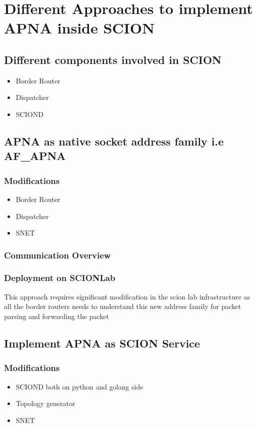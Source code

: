 
\chapter{Different Approaches to implement APNA inside SCION} %

\label{overview} %

\section{Different components involved in SCION}
\begin{itemize}
\item Border Router
\item Dispatcher
\item SCIOND
\end{itemize}

\section{APNA as native socket address family i.e AF\_APNA}
\subsection{Modifications}
\begin{itemize}
	\item Border Router
    \item Dispatcher
    \item SNET
\end{itemize}

\subsection{Communication Overview}

\subsection{Deployment on SCIONLab}
This approach requires significant modification in the scion lab infrastructure as all the border routers needs to understand this new address family for packet parsing and forwarding the packet

\section{Implement APNA as SCION Service}
\subsection{Modifications}
\begin{itemize}
	\item SCIOND both on python and golang side
    \item Topology generator
    \item SNET
\end{itemize}


